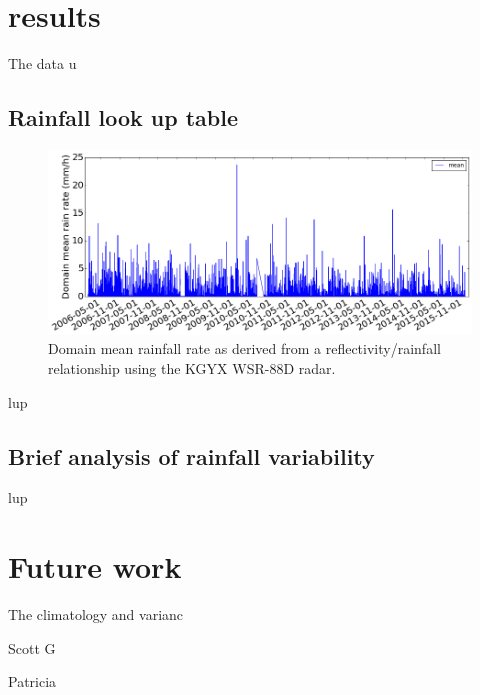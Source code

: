 \documentclass[twocol]{ametsoc}
\begin{document}
\section{results}
The data u
\subsection{Rainfall look up table}
\begin{figure}[h]
    \centering
    \includegraphics[width=0.95\columnwidth]{climatology.png}
    \caption{Domain mean rainfall rate as derived from a reflectivity/rainfall relationship using the KGYX WSR-88D radar. }
    \label{fig:clim}
\end{figure}
lup
\subsection{Brief analysis of rainfall variability}
lup


\section{Future work}
The climatology and varianc


\acknowledgments{}

Scott G

Patricia

%
%
%
\end{document}
